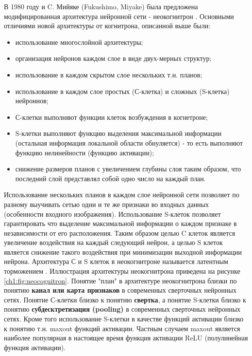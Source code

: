 \documentclass[12pt]{article}
\begin{document}
\begin{sloppypar}
В 1980 году  и C. Мийяке (Fukushimo, Miyake) была предложена модифицированная архитектура нейронной сети - неокогнитрон \cite{fukushima1982neocognitron}. 
Основными отличиями новой архитектуры от когнитрона, описанной выше были:
\begin{itemize}\itemsep 0em
    \item использование многослойной архитектуры;
    \item организация нейронов каждом слое в виде двух-мерных структур;
    \item использование в каждом скрытом слое нескольких т.н. планов;
    \item использование в каждом слое простых (С-клетка) и сложных (S-клетка) нейроннов;
    \item С-клетки выполняют функции клеток возбуждения в когнетроне;
    \item S-клетки выполняют функцию выделения максимальной информации (остальная информация локальной области обнуляется) - то есть выполняют функцию нелинейности (функцию активации);
    \item снижение размеров планов с увеличением глубины слоя таким образом, что последний слой представлял собой одно число на каждый план.
\end{itemize}
Использование нескольких планов в каждом слое нейронной сети позволяет по разному выучивать сетью одни и те же признаки во входных данных (особенности входного изображения). Использование S-клеток позволяет гарантировать что выделение максимальной информации о каждом признаке в независимости от его расположения. Таким образом целью C клеток является увеличение воздействия на каждый следующий нейрон, а целью S клеток является снижение такого воздействия при минимизации выходной информации нейрона. Архитектура С и S клеток в неокогнитроне называется латентным торможением 
\cite{aksenov2006neocognitron}. Иллюстрация архитектуры неокогнитрона приведена на рисунке \ref{ch1:fig:neocognitron}. 
Понятие "план" в архитектуре неокогнитрона близки по понятию \textbf{канал или карта признаков} в современных сверточных нейронных сетях. Понятие С-клетки близко к понятию \textbf{свертка}, а понятие S-клетки близко к понятию \textbf{субдесктретизация (pooling)} в современных сверточных нейронных сетях. Кроме того использование S-клетки в качестве функций активации близко к понятию т.н. maxout функций активации. Частным случаем maxout является наиболее популярная в настоящее время функция активации ReLU (полулинейная функция активации).


\end{sloppypar}
\end{document}

